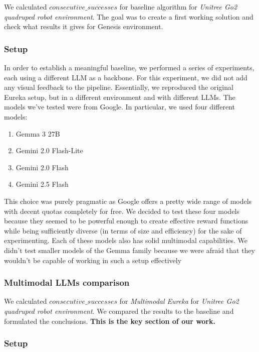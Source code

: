 \documentclass[10pt,twocolumn]{article}
\begin{document}
We calculated $consecutive\_successes$ for baseline algorithm for \textit{Unitree Go2 quadruped robot environment}. The goal was to create a first working solution and check what results it gives for Genesis environment.

\subsubsection*{Setup}

In order to establish a meaningful baseline, we performed a series of experiments, each using a different LLM as a backbone. For this experiment, we did not add any visual feedback to the pipeline. Essentially, we reproduced the original Eureka setup, but in a different environment and with different LLMs. The models we've tested were from Google. In particular, we used four different models:

\begin{enumerate}
    \item Gemma 3 27B
    \item Gemini 2.0 Flash-Lite
    \item Gemini 2.0 Flash
    \item Gemini 2.5 Flash
\end{enumerate}

This choice was purely pragmatic as Google offers a pretty wide range of models with decent quotas completely for free. We decided to test these four models because they seemed to be powerful enough to create effective reward functions while being sufficiently diverse (in terms of size and efficiency) for the sake of experimenting. Each of these models also has solid multimodal capabilities. We didn't test smaller models of the Gemma family because we were afraid that they wouldn't be capable of working in such a setup effectively

\subsubsection{Multimodal LLMs comparison}

We calculated $consecutive\_successes$ for \textit{Multimodal Eureka} for \textit{Unitree Go2 quadruped robot environment}. We compared the results to the baseline and formulated the conclusions.\textbf{ This is the key section of our work.}

\subsubsection*{Setup}
\end{document}
